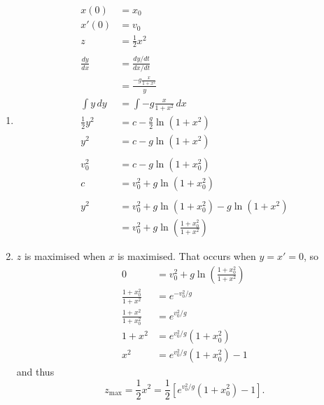 \documentclass{article}
\begin{document}
\begin{enumerate}
  \item

        \begin{align*}
          x(0)            & = x_0                                                    \\
          x'(0)           & = v_0                                                    \\
          z               & = \frac{1}{2} x^2                                        \\ \\
          \frac{d y}{d x} & = \frac{d y / d t}{d x / d t}                            \\
                          & = \frac{-g \frac{x}{1 + x^2}}{y}                         \\
          \int y \,dy     & = \int -g \frac{x}{1 + x^2} \,dx                         \\
          \frac{1}{2} y^2 & = c - \frac{g}{2} \ln (1 + x^2)                          \\
          y^2             & = c - g \ln (1 + x^2)                                    \\ \\
          v_0^2           & = c - g \ln (1 + x_0^2)                                  \\
          c               & = v_0^2 + g \ln (1 + x_0^2)                              \\ \\
          y^2             & = v_0^2 + g \ln (1 + x_0^2) - g \ln (1 + x^2)            \\
                          & = v_0^2 + g \ln \left( \frac{1 + x_0^2}{1 + x^2} \right)
        \end{align*}

  \item $z$ is maximised when $x$ is maximised. That occurs when $y = x' = 0$, so \begin{align*}
          0                         & = v_0^2 + g \ln \left( \frac{1 + x_0^2}{1 + x^2} \right) \\
          \frac{1 + x_0^2}{1 + x^2} & = e^{-v_0^2 / g}                                         \\
          \frac{1 + x^2}{1 + x_0^2} & = e^{v_0^2 / g}                                          \\
          1 + x^2                   & = e^{v_0^2 / g} (1 + x_0^2)                              \\
          x^2                       & = e^{v_0^2 / g} (1 + x_0^2) - 1
        \end{align*} and thus \[z_\text{max} = \frac{1}{2} x^2 = \frac{1}{2} \left[ e^{v_0^2 / g} (1 + x_0^2) - 1 \right].\]
\end{enumerate}
\end{document}
